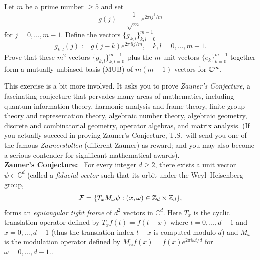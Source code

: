 \begin{myexercise} 
Let $m$ be a prime number $\ge 5$ and set 
$$g(j) = \frac{1}{\sqrt{m}}e^{2\pi i j^3/m}$$
for $j=0,\dots,m-1$. Define the vectors $\{g_{k,l}\}_{k,l=0}^{m-1}$ 
\begin{equation*}
g_{k,l}(j) := g(j-k) e^{2\pi i lj/m}, \quad k,l=0,\dots,m-1.
\end{equation*}
Prove that these  $m^2$ vectors $\{g_{k,l}\}_{k,l=0}^{m-1}$ plus the $m$ unit vectors $\{e_k\}_{k=0}^{m-1}$ together form a mutually unbiased basis (MUB) of $m(m+1)$ vectors for $\mathbb{C}^m$.
\end{myexercise}


\begin{myexercise}
This exercise is a bit more involved. It asks you to prove {\em Zauner's Conjecture}, a
fascinating conjecture that pervades many areas of mathematics, including quantum information theory, harmonic analysis and frame theory, finite group theory and representation theory, algebraic number theory, algebraic geometry, discrete and combinatorial geometry, operator algebras, and matrix analysis.
(If you actually succeed in proving Zauner's Conjecture, T.S.\ will send you one of the famous {\em Zaunerstollen} (different Zauner) as reward; and you may also become a serious contender for significant mathematical awards). \\
\textbf{Zauner's Conjecture:}~\cite{zauner1999quantendesigns,renes2004symmetric} For every integer $d \ge 2$, there exists a unit vector $\psi \in \mathbb C^d$ (called a {\em fiducial vector} such that its orbit under the Weyl–Heisenberg group,
$$
\mathcal F = \{ T_x M_{\omega}\psi : (x,\omega)\in  \mathbb{Z}_d \times \mathbb{Z}_d \},
$$
forms an {\em equiangular tight frame} of $d^2$ vectors in $\mathbb C^d$. Here $T_x$ is the cyclic translation operator defined by $T_x f(t) = f(t-x)$ where $t= 0,\dots,d-1$ and $x= 0,\dots,d-1$ (thus the translation index $t-x$ is computed modulo $d$) and $M_{\omega}$ is the modulation operator defined by $M_{\omega} f(x) = f(x) e^{2\pi i \omega t/d}$ for $\omega =0,\dots,d-1.$.
\end{myexercise}





